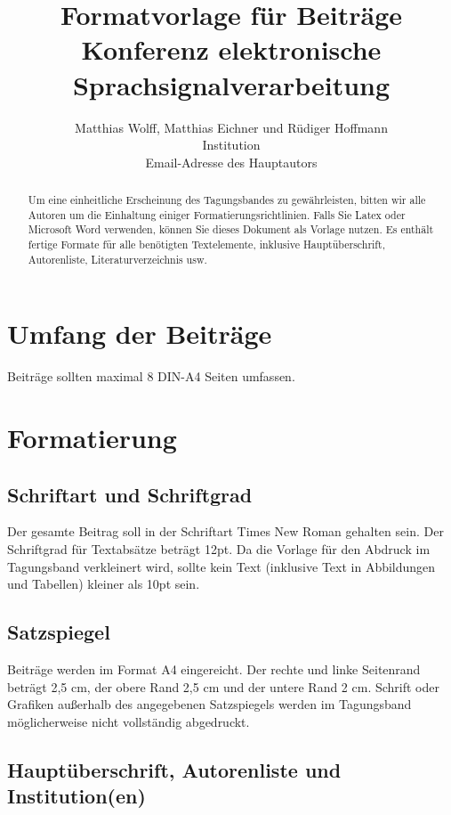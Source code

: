 \documentclass[12pt,a4paper]{article}
\title{
  Formatvorlage für Beiträge Konferenz elektronische Sprachsignalverarbeitung
}
\author{
  Matthias Wolff, Matthias Eichner und Rüdiger Hoffmann\\[6pt]
  Institution\\
  Email-Adresse des Hauptautors
}
\date{}
\begin{document}

\maketitle

\begin{abstract}
  Um eine einheitliche Erscheinung des Tagungsbandes zu gewährleisten, bitten wir alle Autoren 
  um die Einhaltung einiger Formatierungsrichtlinien. Falls Sie Latex oder Microsoft Word verwenden, 
  können Sie dieses Dokument als Vorlage nutzen. Es enthält fertige Formate für alle benötigten 
  Textelemente, inklusive Hauptüberschrift, Autorenliste, Literaturverzeichnis usw.
\end{abstract}

\section{Umfang der Beiträge}

Beiträge sollten maximal 8 DIN-A4 Seiten umfassen.

\section{Formatierung}

\subsection{Schriftart und Schriftgrad}

Der gesamte Beitrag soll in der Schriftart Times New Roman gehalten sein. Der Schriftgrad für 
Textabsätze beträgt 12pt. Da die Vorlage für den Abdruck im Tagungsband verkleinert wird, sollte 
kein Text (inklusive Text in Abbildungen und Tabellen) kleiner als 10pt sein. 

\subsection{Satzspiegel}

Beiträge werden im Format A4 eingereicht. Der rechte und linke Seitenrand beträgt 2,5 cm, der 
obere Rand 2,5 cm und der untere Rand 2 cm. Schrift oder Grafiken außerhalb des angegebenen 
Satzspiegels werden im Tagungsband möglicherweise nicht vollständig abgedruckt. 

\subsection{Hauptüberschrift, Autorenliste und Institution(en)}
\end{document}
